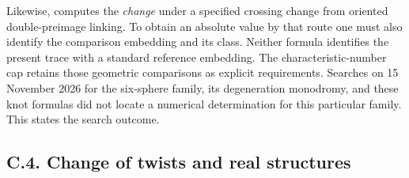 Likewise, \citet[Theorem 2.5]{Sakai2015Root} computes the
\emph{change} under a specified crossing change from oriented
double-preimage linking. To obtain an absolute value by that
route one must also identify the comparison embedding and its
class. Neither formula identifies the present trace with a
standard reference embedding. The characteristic-number cap
retains those geometric comparisons as explicit requirements.
Searches on 15 November 2026 for the six-sphere family,
its degeneration monodromy, and these knot formulas did not
locate a numerical determination for this particular family.
This states the search outcome.


\subsection{C.4. Change of twists and real structures}

